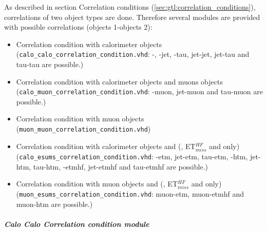 As described in section Correlation conditions (\ref{sec:gtl:correlation_conditions}), correlations of two object types are done. Therefore several modules are provided
with possible correlations (objects 1-objects 2):
\begin{itemize}
\item Correlation condition with calorimeter objects\\(\texttt{calo\_calo\_correlation\_condition.vhd}:
\egamma-\egamma, \egamma-jet, \egamma-tau, jet-jet, jet-tau and tau-tau are possible.)
\item Correlation condition with calorimeter objects and muons objects\\(\texttt{calo\_muon\_correlation\_condition.vhd}: \egamma-muon, jet-muon and tau-muon are possible.)
\item Correlation condition with muon objects\\(\texttt{muon\_muon\_correlation\_condition.vhd})
\item Correlation condition with calorimeter objects and \esums (\etm, ET$_{miss}^{HF}$ and \htm only)\\(\texttt{calo\_esums\_correlation\_condition.vhd}: \egamma-etm, jet-etm, tau-etm,
\egamma-htm, jet-htm, tau-htm, \egamma-etmhf, jet-etmhf and tau-etmhf are possible.)
\item Correlation condition with muon objects and \esums (\etm, ET$_{miss}^{HF}$ and \htm only)\\(\texttt{muon\_esums\_correlation\_condition.vhd}: muon-etm, muon-etmhf and muon-htm are possible.)
\end{itemize}

\subparagraph{Calo Calo Correlation condition module}
\label{sec:gtl:calo_calo_correlation_condition_module}

